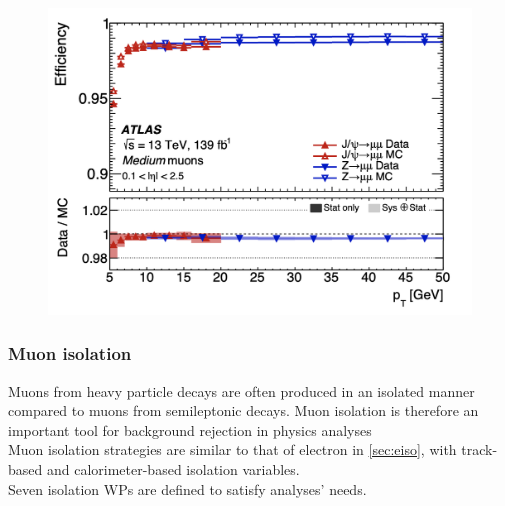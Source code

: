 \documentclass[../thesis.tex]{subfiles}
\begin{document}
\begin{figure}[!htbp]
\centering
\includegraphics[width=0.9\linewidth]{fig/reco_muon_ID.png}
\caption{\label{fig:reco:muon_ID}\citep{reco:muon_ID}}
\end{figure}

\subsubsection*{Muon isolation}
Muons from heavy particle decays are often produced in an isolated manner compared to muons from semileptonic decays. Muon isolation is therefore an important tool for background rejection in physics analyses\\
Muon isolation strategies are similar to that of electron in \autoref{sec:eiso}, with track-based and calorimeter-based isolation variables.\\
Seven isolation WPs are defined to satisfy analyses' needs.
\end{document}
